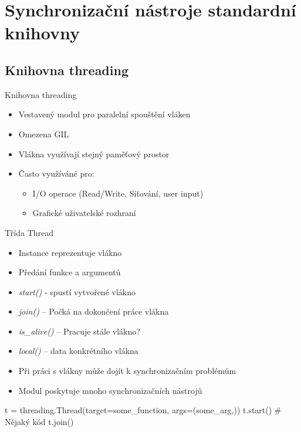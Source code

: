 \documentclass{beamer}
\begin{document}
\section{Synchronizační nástroje standardní knihovny}
\subsection{Knihovna threading}

\begin{frame}{Knihovna threading}
    \begin{itemize}
        \item Vestavený modul pro paralelní spouštění vláken
        \item Omezena GIL
        \item Vlákna využívají stejný paměťový prostor
        \vskip 0.35in
        \item Často využíváné pro:
        \begin{itemize}
            \item I/O operace (Read/Write, Síťování, user input)
            \item Grafické uživatelské rozhraní 
        \end{itemize}
    \end{itemize}
\end{frame}

\begin{frame}[fragile]{Třída Thread}
    \begin{itemize}
        \item Instance reprezentuje vlákno
        \item Předání funkce a argumentů
        \vskip 0.2in

        \item \textit{start()} - spustí vytvořené vlákno
        \item \textit{join()} – Počká na dokončení práce vlákna
        \item \textit{is\_alive()} – Pracuje stále vlákno?
        \item \textit{local()} – data konkrétního vlákna

        \vskip 0.2in
        \item Při práci s vlákny může dojít k synchronizačním problémům
        \item Modul poskytuje mnoho synchronizačních nástrojů
    \end{itemize}
    \scriptsize
    \begin{semiverbatim}
    t = threading.Thread(target=some_function, args=(some_arg,))
    t.start()
    # Nějaký kód
    t.join()
    \end{semiverbatim}
\end{frame}
\end{document}
